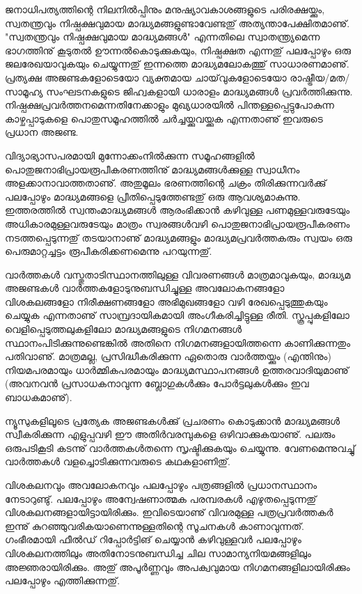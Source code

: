 ﻿
\vskip 2pt

ജനാധിപത്യത്തിന്റെ നിലനില്‍പ്പിനും മനുഷ്യാവകാശങ്ങളുടെ പരിരക്ഷയ്ക്കും, സ്വതന്ത്രവും നിഷ്പക്ഷവുമായ 
മാദ്ധ്യമങ്ങളുണ്ടാവേണ്ടതു് അത്യന്താപേക്ഷിതമാണു്. "സ്വതന്ത്രവും നിഷ്പക്ഷവുമായ മാദ്ധ്യമങ്ങള്‍" എന്നതിലെ 
സ്വാതന്ത്ര്യമെന്ന ഭാഗത്തിനു് കൂടുതല്‍ ഊന്നല്‍കൊടുക്കുകയും, നിഷ്പക്ഷത എന്നതു് പലപ്പോഴും ഒരു ജലരേഖയാവുകയും 
ചെയ്യുന്നതു് ഇന്നത്തെ മാദ്ധ്യമലോകത്തു് സാധാരണമാണു്. പ്രത്യക്ഷ അജണ്ടകളോടെയോ വ്യക്തമായ 
ചായ്‌വുകളോടെയോ രാഷ്ട്രീയ/മത/സാമൂഹ്യ സംഘടനകളുടെ ജിഹ്വകളായി ധാരാളം മാദ്ധ്യമങ്ങള്‍ പ്രവര്‍ത്തിക്കുന്നു. 
നിഷ്പക്ഷപ്രവര്‍ത്തനമെന്നതിനേക്കാളും മുഖ്യധാരയില്‍ പിന്തള്ളപ്പെട്ടുപോകുന്ന കാഴ്ചപ്പാടുകളെ പൊതുസമൂഹത്തില്‍ 
ചര്‍ച്ചയ്ക്കുവയ്ക്കുക എന്നതാണു് ഇവരുടെ പ്രധാന അജണ്ട.

വിദ്യാഭ്യാസപരമായി മുന്നോക്കംനില്‍ക്കുന്ന സമൂഹങ്ങളില്‍ പൊതുജനാഭിപ്രായരൂപീകരണത്തിനു് മാദ്ധ്യമങ്ങള്‍ക്കുള്ള 
സ്വാധീനം അളക്കാനാവാത്തതാണു്. അതുമൂലം ഭരണത്തിന്റെ ചക്രം തിരിക്കുന്നവര്‍ക്കു് പലപ്പോഴും മാദ്ധ്യമങ്ങളെ 
പ്രീതിപ്പെടുത്തേണ്ടതു് ഒരു ആവശ്യമാകുന്നു. ഇത്തരത്തില്‍ സ്വന്തംമാദ്ധ്യമങ്ങള്‍ ആരംഭിക്കാന്‍ കഴിവുള്ള പണമുള്ളവരുടേയും 
അധികാരമുള്ളവരുടേയും മാത്രം സ്വരങ്ങള്‍വഴി പൊതുജനാഭിപ്രായരൂപീകരണം നടത്തപ്പെടുന്നതു് തടയാനാണു് 
മാദ്ധ്യമങ്ങളും മാദ്ധ്യമപ്രവര്‍ത്തകരും സ്വയം ഒരു പെരുമാറ്റച്ചട്ടം രൂപീകരിക്കണമെന്നു പറയുന്നതു്.

വാര്‍ത്തകള്‍ വസ്തുതാടിസ്ഥാനത്തിലുള്ള വിവരണങ്ങള്‍ മാത്രമാവുകയും, മാദ്ധ്യമ അജണ്ടകള്‍ 
വാര്‍ത്തകളോടുനുബന്ധിച്ചുള്ള അവലോകനങ്ങളോ വിശകലങ്ങളോ നിരീക്ഷണങ്ങളോ അഭിമുഖങ്ങളോ വഴി 
രേഖപ്പെടുത്തുകയും ചെയ്യുക എന്നതാണു് സാമ്പ്രദായികമായി അംഗീകരിച്ചിട്ടുള്ള രീതി. സ്കൂപ്പുകളിലോ 
വെളിപ്പെടുത്തലുകളിലോ മാദ്ധ്യമങ്ങളുടെ നിഗമനങ്ങള്‍ സ്ഥാനംപിടിക്കുന്നുണ്ടെങ്കില്‍ അതിനെ നിഗമനങ്ങളായിത്തന്നെ 
കാണിക്കുന്നതും പതിവാണു്. മാത്രമല്ല, പ്രസിദ്ധീകരിക്കുന്ന ഏതൊരു വാര്‍ത്തയ്ക്കും (എന്തിനും) നിയമപരമായും 
ധാര്‍മ്മികപരമായും മാദ്ധ്യമസ്ഥാപനങ്ങള്‍ ഉത്തരവാദിയുമാണു് (അവനവന്‍ പ്രസാധകനാവുന്ന ബ്ലോഗുകള്‍ക്കും 
പോര്‍ട്ടലുകള്‍ക്കും ഇവ ബാധകമാണു്).

ന്യൂസുകളിലൂടെ പ്രത്യേക അജണ്ടകള്‍ക്കു് പ്രചരണം കൊടുക്കാന്‍ മാദ്ധ്യമങ്ങള്‍ സ്വീകരിക്കുന്ന എളുപ്പവഴി ഈ 
അതിര്‍വരമ്പുകളെ ഒഴിവാക്കുകയാണു്. പലരും ഒരുപടികൂടി കടന്നു് വാര്‍ത്തകള്‍തന്നെ സൃഷ്ടിക്കുകയും ചെയ്യുന്നു. 
വേണമെന്നുവച്ചു് വാര്‍ത്തകള്‍ വളച്ചൊടിക്കുന്നവരുടെ കഥകളാണിതു്.

വിശകലനവും അവലോകനവും പലപ്പോഴും പത്രങ്ങളില്‍ പ്രധാനസ്ഥാനം നേടാറുണ്ടു്. പലപ്പോഴും അന്വേഷണാത്മക 
പരമ്പരകള്‍ എഴുതപ്പെടുന്നതു് വിശകലനങ്ങളായിട്ടായിരിക്കും. ഇവിടെയാണു് വിവരമുള്ള പത്രപ്രവര്‍ത്തകര്‍ ഇന്നു് 
കുറഞ്ഞുവരികയാണെന്നുള്ളതിന്റെ സൂചനകള്‍ കാണാവുന്നത്. ഗംഭീരമായി ഫീല്‍ഡ് റിപ്പോര്‍ട്ടിങ് ചെയ്യാന്‍ 
കഴിവുള്ളവര്‍ പലപ്പോഴും വിശകലനത്തിലും അതിനോടനുബന്ധിച്ച ചില സാമാന്യനിയമങ്ങളിലും അജ്ഞരായിരിക്കും. 
അതു് അപൂര്‍ണ്ണവും അപക്വവുമായ നിഗമനങ്ങളിലായിരിക്കും പലപ്പോഴും എത്തിക്കുന്നതു്.

